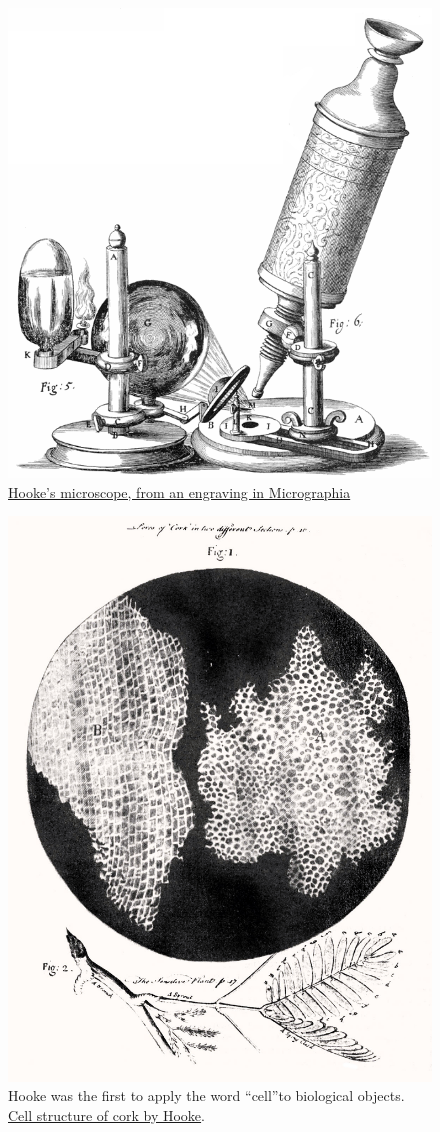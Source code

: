 \begin{figure}

{\centering \includegraphics[width=0.7\linewidth]{./figures/cells/Hooke-microscope} 

}

\caption{\href{https://commons.wikimedia.org/wiki/File:Hooke-microscope.png}{Hooke's microscope, from an engraving in Micrographia}}\label{fig:hookescope}
\end{figure}



\begin{figure}

{\centering \includegraphics[width=0.7\linewidth]{./figures/cells/RobertHookeMicrographia1665} 

}

\caption{Hooke was the first to apply the word ``cell''to biological objects. \href{https://commons.wikimedia.org/wiki/File:RobertHookeMicrographia1665.jpg}{Cell structure of cork by Hooke}.}\label{fig:hookecork}
\end{figure}

